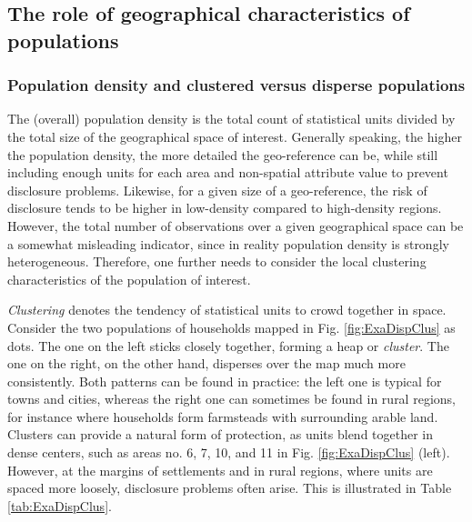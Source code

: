 
\subsection{The role of geographical characteristics of populations} \label{sec:ident_geochar}

\subsubsection{Population density and clustered versus disperse populations}

The (overall) population density is the total count of statistical units divided by the total size of the geographical space of interest. Generally speaking, the higher the population density, the more detailed the geo-reference can be, while still including enough units for each area and non-spatial attribute value to prevent disclosure problems. Likewise, for a given size of a geo-reference, the risk of disclosure tends to be higher in low-density compared to high-density regions. However, the total number of observations over a given geographical space can be a somewhat misleading indicator, since in reality population density is strongly heterogeneous. Therefore, one further needs to consider the local clustering characteristics of the population of interest.

\emph{Clustering} denotes the tendency of statistical units to crowd together in space. Consider the two populations of households mapped in Fig. \ref{fig:ExaDispClus} as dots. The one on the left sticks closely together, forming a heap or \emph{cluster}. The one on the right, on the other hand, disperses over the map much more consistently. Both patterns can be found in practice: the left one is typical for towns and cities, whereas the right one can sometimes be found in rural regions, for instance where households form farmsteads with surrounding arable land.
Clusters can provide a natural form of protection, as units blend together in dense centers, such as areas no. 6, 7, 10, and 11 in Fig. \ref{fig:ExaDispClus} (left). However, at the margins of settlements and in rural regions, where units are spaced more loosely, disclosure problems often arise. This is illustrated in Table \ref{tab:ExaDispClus}.


